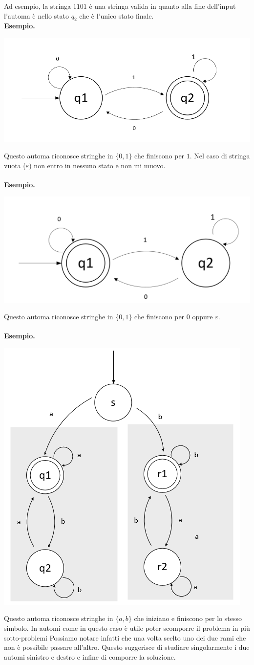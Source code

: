 \documentclass[italian]{article}
\newcommand{\example}{\noindent\textbf{Esempio.\quad}}
\begin{document}
Ad esempio, la stringa $1101$ è una stringa valida in quanto alla fine dell'input l'automa è nello stato $q_2$ che è l'unico stato finale.
\pagebreak \\
\example
\begin{center}
	\includegraphics[width=0.5\linewidth]{images/automa3}
\end{center}
Questo automa riconosce stringhe in $\{0,1\}$ che finiscono per $1$. Nel caso di stringa vuota ($\varepsilon$) non entro in nessuno stato e non mi muovo. \\\\
\example
\begin{center}
	\includegraphics[width=0.5\linewidth]{images/automa4}
\end{center}
Questo automa riconosce stringhe in $\{0,1\}$ che finiscono per $0$ oppure $\varepsilon$.\\\\
\example
\begin{center}
	\includegraphics[width=0.5\linewidth]{images/automa5}
\end{center}
Questo automa riconosce stringhe in $\{a,b\}$ che iniziano e finiscono per lo stesso simbolo. In automi come in questo caso è utile poter scomporre il problema in più sotto-problemi Possiamo notare infatti che una volta scelto uno dei due rami che non è possibile passare all'altro. Questo suggerisce di studiare singolarmente i due automi sinistro e destro e infine di comporre la soluzione. \\\\
\end{document}
